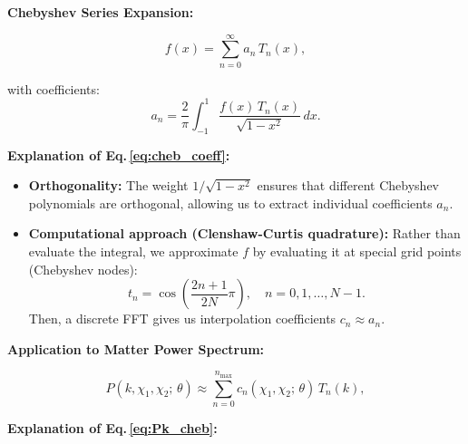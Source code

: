 \noindent\textbf{\large Chebyshev Series Expansion:}

\begin{equation}
    f(x) = \sum_{n=0}^\infty a_n\,T_n(x),
\end{equation}

with coefficients:
\begin{equation}
    a_n = \frac{2}{\pi}\int_{-1}^{1}\frac{f(x)\,T_n(x)}{\sqrt{1-x^2}}\,dx.
    \label{eq:cheb_coeff}
\end{equation}

\noindent\textbf{\large Explanation of Eq.\,\eqref{eq:cheb_coeff}:}\\

\begin{itemize}[leftmargin=1.5cm]
    \item \textbf{Orthogonality:} The weight $1/\sqrt{1-x^2}$ ensures that different Chebyshev polynomials are orthogonal, allowing us to extract individual coefficients $a_n$.
    
    \item \textbf{Computational approach (Clenshaw-Curtis quadrature):} Rather than evaluate the integral, we approximate $f$ by evaluating it at special grid points (Chebyshev nodes):
    \begin{equation}
        t_n = \cos\left(\frac{2n+1}{2N}\pi\right), \quad n = 0, 1, \ldots, N-1.
    \end{equation}
    Then, a discrete FFT gives us interpolation coefficients $c_n \approx a_n$.
\end{itemize}

\noindent\textbf{\large Application to Matter Power Spectrum:}

\begin{equation}
    P(k,\chi_1,\chi_2;\,\theta) \approx
    \sum_{n=0}^{n_{\max}} c_n(\chi_1,\chi_2;\,\theta)\,T_n(k),
    \label{eq:Pk_cheb}
\end{equation}

\noindent\textbf{\large Explanation of Eq.\,\eqref{eq:Pk_cheb}:}\\


